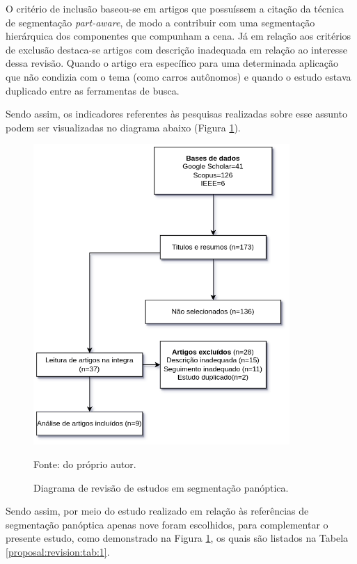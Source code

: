 O critério de inclusão baseou-se em artigos que possuíssem a citação da técnica de segmentação \textit{part-aware}, de modo a contribuir com uma segmentação hierárquica dos componentes que compunham a cena. Já em relação aos critérios de exclusão destaca-se artigos com descrição inadequada em relação ao interesse dessa revisão. Quando o artigo era específico para uma determinada aplicação que não condizia com o tema (como carros autônomos) e quando o estudo estava duplicado entre as ferramentas de busca.

Sendo assim, os indicadores referentes às pesquisas realizadas sobre esse assunto podem ser visualizadas no diagrama abaixo (Figura \ref{proposal:revision:fig:1}).

\begin{figure}[H]
    \centering
    \caption{Diagrama de revisão de estudos em segmentação panóptica.}
    \includegraphics[height=4.5in]{recursos/imagens/proposal/revisao_panoptica.png}
    \label{proposal:revision:fig:1}

    Fonte: do próprio autor.
\end{figure}

Sendo assim, por meio do estudo realizado em relação às referências de segmentação panóptica apenas nove foram escolhidos, para complementar o presente estudo, como demonstrado na Figura \ref{proposal:revision:fig:1}, os quais são listados na Tabela \ref{proposal:revision:tab:1}.

